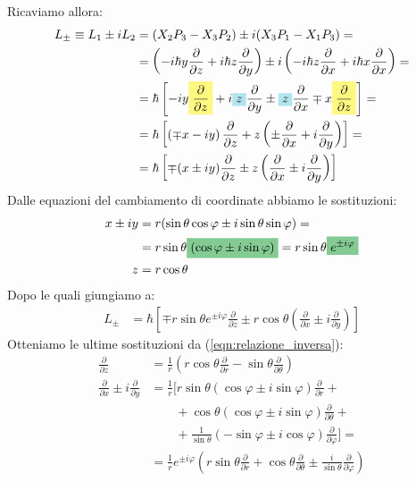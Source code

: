 \documentclass[../../FisicaTeorica.tex]{subfiles}
\begin{document}
Ricaviamo allora:
\begin{align*}
L_\pm \equiv L_1 \pm iL_2 &= (X_2 P_3-X_3P_2)\pm i(X_3P_1 -X_1P_3)=\\
&=\left(-i\hbar y\frac{\partial}{\partial z}+i\hbar z \frac{\partial}{\partial y} \right) \pm i \left(-i\hbar z \frac{\partial}{\partial x} + i\hbar x \frac{\partial}{\partial x}\right)=\\
&=\hbar \left[-iy \hlc{Yellow}{\frac{\partial}{\partial z}} + i\hlc{SkyBlue}{z} \frac{\partial}{\partial y} \pm \hlc{SkyBlue}{z} \frac{\partial}{\partial x} \mp x\hlc{Yellow}{\frac{\partial}{\partial z}}\right]=\\
&=\hbar\left[\left(\mp x -iy\right)\frac{\partial}{\partial z} +z\left(\pm \frac{\partial}{\partial x}+i\frac{\partial}{\partial y}\right)\right]=\\
&=\hbar\left[\mp(x\pm iy)\frac{\partial}{\partial z} \pm z\left(\frac{\partial}{\partial x}\pm i \frac{\partial}{\partial y}\right)\right]
\end{align*}
Dalle equazioni del cambiamento di coordinate abbiamo le sostituzioni:
\begin{align*}
x \pm i y&= r(\sin\theta\cos\varphi \pm i \sin\theta\sin\varphi)=\\ &= r\sin\theta\hlc{ForestGreen}{(\cos\varphi \pm i\sin\varphi)}=r\sin\theta \hlc{ForestGreen}{e^{\pm i\varphi}}\\
z &= r\cos\theta
\end{align*}
Dopo le quali giungiamo a:
\begin{align*}
L_\pm &= \hbar \left[\mp r \sin\theta e^{\pm i\varphi}\frac{\partial}{\partial z} \pm r\cos \theta \left(\frac{\partial}{\partial x} \pm i \frac{\partial}{\partial y}\right) \right]
\end{align*}
Otteniamo le ultime sostituzioni da (\ref{eqn:relazione_inversa}):
\begin{align*}
\frac{\partial}{\partial z} &= \frac{1}{r}\left( r\cos\theta \frac{\partial}{\partial r} - \sin\theta\frac{\partial}{\partial \theta}\right)\\
\frac{\partial}{\partial x} \pm i\frac{\partial}{\partial y} &= \frac{1}{r}\Big [ r\sin\theta\left(\cos\varphi \pm i\sin\varphi\right) \frac{\partial}{\partial r} +\\
&\qquad +\cos\theta(\cos\varphi \pm i\sin\varphi)\frac{\partial}{\partial \theta} +\\
&\qquad +\frac{1}{\sin\theta}(-\sin\varphi \pm i\cos\varphi)\frac{\partial}{\partial \varphi}\Big] =\\
&=\frac{1}{r}e^{\pm i\varphi}\left(r\sin\theta \frac{\partial}{\partial r} + \cos\theta \frac{\partial}{\partial\theta}\pm \frac{i}{\sin\theta}\frac{\partial}{\partial \varphi}\right)
\end{align*}
\end{document}
